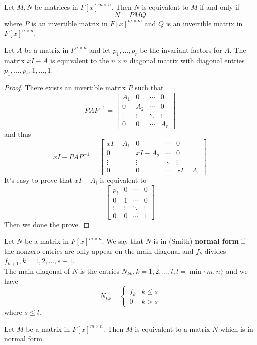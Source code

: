 \documentclass{article}
\begin{document}
\begin{thm}
	Let $M,N$ be matrices in $F[x]^{m\times n}$. Then $N$ is equivalent to $M$ if and only if 
	\[N=PMQ\]
	where $P$ is an invertible matrix in $F[x]^{m\times m}$ and $Q$ is an invertible matrix in $F[x]^{n\times n}$.
\end{thm}
\begin{thm}
	Let $A$ be a matrix in $F^{n\times n}$ and let $p_1,\dots,p_r$ be the invariant factors for $A$. The matrix $xI-A$ is equivalent to the $n\times n$ diagonal matrix with diagonal entries $p_1,\dots,p_r,1,\dots,1$.
\end{thm}
\begin{proof}
	There exists an invertible matrix $P$ such that
	\[PAP^{-1}=\begin{bmatrix}
		A_1&0&\cdots&0\\
		0&A_2&\cdots&0\\
		\vdots&\vdots&\ddots&\vdots\\
		0&0&\cdots&A_r
	\end{bmatrix}\]
	and thus 
	\[xI-PAP^{-1}=\begin{bmatrix}
		xI-A_1&0&\cdots&0\\
		0&xI-A_2&\cdots&0\\
		\vdots&\vdots&\ddots&\vdots\\
		0&0&\cdots&xI-A_r
	\end{bmatrix}\]
	It's easy to prove that $xI-A_i$ is equivalent to
	\[\begin{bmatrix}
		p_i&0&\cdots&0\\
		0&1&\cdots&0\\
		\vdots&\vdots&\ddots&\vdots\\
		0&0&\cdots&1
	\end{bmatrix}\]
	Then we done the prove.
\end{proof}
\begin{dde}
	Let $N$ be a matrix in $F[x]^{m\times n}$. We say that $N$ is in (Smith) \textbf{normal form} if the nonzero entries are only appear on the main diagonal and $f_k$ divides $f_{k+1},k=1,2,\dots,s-1$. \\The main diagonal of $N$ is the entries $N_{kk},k=1,2,\dots,l,l=\min\{m,n\}$ and we have
	\[N_{kk}=\begin{cases}
		f_k&k\le s\\
		0&k> s
	\end{cases}\]
	where $s\le l$.
\end{dde}
\begin{thm}
	Let $M$ be a matrix in $F[x]^{m\times n}$. Then $M$ is equivalent to a matrix $N$ which is in normal form.
\end{thm}
\end{document}
